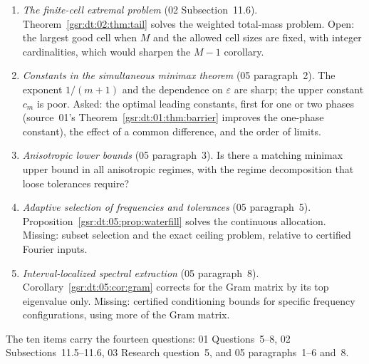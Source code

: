 \documentclass[11pt,letterpaper]{article}
\numberwithin{equation}{section}
\theoremstyle{definition}
\theoremstyle{remark}
\newcommand{\1}{\mathbf 1}
\begin{document}
\begin{enumerate}[label=\textbf{I.\arabic*},ref=I.\arabic*,leftmargin=2.6em]
\item\label{gsr:fz:q:I:finitecell} \emph{The finite-cell extremal problem} (02 Subsection~11.6). Theorem~\ref{gsr:dt:02:thm:tail} solves the weighted total-mass problem. Open: the largest good cell when $M$ and the allowed cell sizes are fixed, with integer cardinalities, which would sharpen the $M-1$ corollary.
\item\label{gsr:fz:q:I:minimax} \emph{Constants in the simultaneous minimax theorem} (05 paragraph~2). The exponent $1/(m+1)$ and the dependence on $\varepsilon$ are sharp; the upper constant $c_m$ is poor. Asked: the optimal leading constants, first for one or two phases (source~01's Theorem~\ref{gsr:dt:01:thm:barrier} improves the one-phase constant), the effect of a common difference, and the order of limits.
\item\label{gsr:fz:q:I:aniso} \emph{Anisotropic lower bounds} (05 paragraph~3). Is there a matching minimax upper bound in all anisotropic regimes, with the regime decomposition that loose tolerances require?
\item\label{gsr:fz:q:I:adaptive} \emph{Adaptive selection of frequencies and tolerances} (05 paragraph~5). Proposition~\ref{gsr:dt:05:prop:waterfill} solves the continuous allocation. Missing: subset selection and the exact ceiling problem, relative to certified Fourier inputs.
\item\label{gsr:fz:q:I:interval} \emph{Interval-localized spectral extraction} (05 paragraph~8). Corollary~\ref{gsr:dt:05:cor:gram} corrects for the Gram matrix by its top eigenvalue only. Missing: certified conditioning bounds for specific frequency configurations, using more of the Gram matrix.
\end{enumerate}
The ten items carry the fourteen questions: 01 Questions~5--8, 02 Subsections~11.5--11.6, 03 Research question~5, and 05 paragraphs~1--6 and~8.
\end{document}

